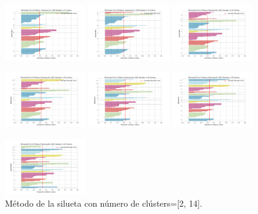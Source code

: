\documentclass[10pt, a4paper]{article}
\begin{document}
\begin{figure}[!h]
			\includegraphics[width = 3.5cm]{silhouette_visualization_8_bf.png}
			\includegraphics[width = 3.5cm]{silhouette_visualization_9_bf.png}
			\includegraphics[width = 3.5cm]{silhouette_visualization_10_bf.png}
		
			\includegraphics[width = 3.5cm]{silhouette_visualization_11_bf.png}
			\includegraphics[width = 3.5cm]{silhouette_visualization_12_bf.png}
			\includegraphics[width = 3.5cm]{silhouette_visualization_13_bf.png}
			
			\includegraphics[width = 3.5cm]{silhouette_visualization_14_bf.png}
			
			\caption{M\'etodo de la silueta con n\'umero de cl\'usters=[2, 14].}
		\end{figure}
		
\end{document}
